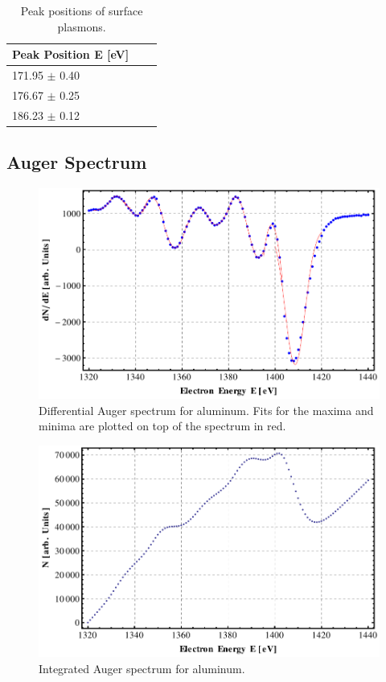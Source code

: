 \documentclass[a4paper,10pt]{scrartcl}
\begin{document}
\begin{table}
\begin{center}
\begin{tabular}{lcc}
\toprule
Peak Position E [eV]\\
\midrule
171.95 $\pm$ 0.40 \\
176.67 $\pm$ 0.25 \\
186.23 $\pm$ 0.12 \\
\bottomrule
\end{tabular}
\end{center}
\par
\caption{Peak positions of surface plasmons. \label{tab:surfacepeaks}}
\end{table}


\subsection{Auger Spectrum}

\begin{figure}
\centering
\includegraphics[scale=0.6]{img/augerpeaks}
\caption{Differential Auger spectrum for aluminum. Fits for the maxima and minima are plotted on top of the spectrum in red. \label{fig:augerpeaks}}
\end{figure}

\begin{figure}
\centering
\includegraphics[scale=0.6]{img/intaugerpeaks}
\caption{Integrated Auger spectrum for aluminum. \label{fig:intaugerpeaks}}
\end{figure}
\end{document}
